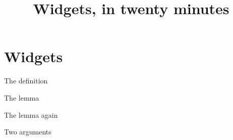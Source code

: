 \documentclass{beamer}
\title{Widgets, in twenty minutes}
\theoremstyle{definition}
\begin{document}
\begin{frame}
\titlepage
\end{frame}

\section{Widgets}\label{sy-0400}

\begin{frame}{The definition}

\end{frame}

\begin{frame}{The lemma}

\end{frame}

\begin{frame}{The lemma again}

\end{frame}

\begin{frame}{Two arguments}

\end{frame}
\end{document}

